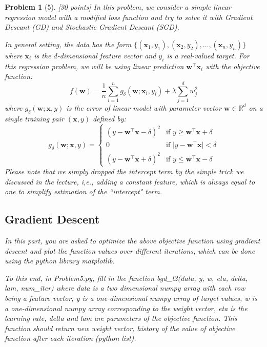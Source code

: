 \documentclass[11pt]{article}
\theoremstyle{quest}
\newtheorem*{problem}{Problem}
\begin{document}
\begin{problem}[5]
[30 points] In this problem, we consider a simple linear regression model with a modified loss function and try to solve it with Gradient Descant (GD) and Stochastic Gradient Descant (SGD).

In general setting, the data has the form $\{(\bm{x}_{1}, y_1),(\bm{x}_{2}, y_2),\dots,(\bm{x}_{n}, y_n)\}$ where $\bm{x}_i$ is the $d$-dimensional feature vector and $y_i$ is a real-valued target. For this regression problem, we will be using linear prediction $\bm{w}^{\top}\bm{x}_i$ with the objective function:
$$
f(\bm{w}) = \frac{1}{n}\sum_{i=1}^{n}g_{\delta}(\bm{w};\bm{x}_{i}, y_i) + \lambda\sum_{j=1}^{d}w_j^2
$$
where $g_{\delta}(\bm{w};\bm{x}, y)$ is the error of linear model with parameter vector $\bm{w} \in \mathbb{R}^d$ on a single training pair $(\bm{x}, y)$ defined by:
$$
g_{\delta}(\bm{w};\bm{x}, y)=  \begin{cases}
     (y - \bm{w}^{\top}\bm{x} - \delta)^2  & \text{if } y \geq \bm{w}^{\top}\bm{x} + \delta\\
     0                                    & \text{if } \lvert y - \bm{w}^{\top}\bm{x} \rvert < \delta\\
     (y - \bm{w}^{\top}\bm{x} + \delta)^2  & \text{if } y \leq \bm{w}^{\top}\bm{x} - \delta
    \end{cases}
$$
Please note that we simply dropped the intercept term by the simple trick we discussed in the lecture, i,e., adding a constant feature, which is always equal to one to simplify estimation of the ``intercept" term.

\subsection*{Gradient Descent}
In this part, you are asked to optimize the above objective function using gradient descent and plot the function values over different iterations, which can be done using the python library \textsf{matplotlib}.

To this end, in \textsf{Problem5.py}, fill in the function \textsf{bgd\_l2(data, y, w, eta, delta, lam, num\_iter)} where \textsf{data} is a two dimensional numpy array with each row being a feature vector, \textsf{y} is a one-dimensional numpy array of target values, \textsf{w} is a one-dimensional numpy array corresponding to the weight vector, \textsf{eta} is the learning rate, \textsf{delta} and \textsf{lam} are parameters of the objective function. This function should return new weight vector, history of the value of objective function after each iteration (python list).


\end{problem}
\end{document}
